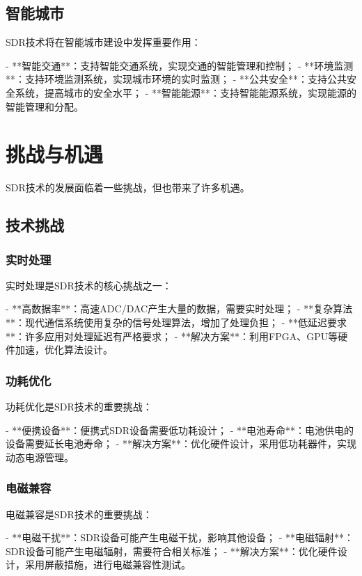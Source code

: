 ﻿\documentclass[UTF8]{ctexbook}
\begin{document}
\subsection{智能城市}

SDR技术将在智能城市建设中发挥重要作用：

- **智能交通**：支持智能交通系统，实现交通的智能管理和控制；
- **环境监测**：支持环境监测系统，实现城市环境的实时监测；
- **公共安全**：支持公共安全系统，提高城市的安全水平；
- **智能能源**：支持智能能源系统，实现能源的智能管理和分配。

\section{挑战与机遇}

SDR技术的发展面临着一些挑战，但也带来了许多机遇。

\subsection{技术挑战}

\subsubsection{实时处理}

实时处理是SDR技术的核心挑战之一：

- **高数据率**：高速ADC/DAC产生大量的数据，需要实时处理；
- **复杂算法**：现代通信系统使用复杂的信号处理算法，增加了处理负担；
- **低延迟要求**：许多应用对处理延迟有严格要求；
- **解决方案**：利用FPGA、GPU等硬件加速，优化算法设计。

\subsubsection{功耗优化}

功耗优化是SDR技术的重要挑战：

- **便携设备**：便携式SDR设备需要低功耗设计；
- **电池寿命**：电池供电的设备需要延长电池寿命；
- **解决方案**：优化硬件设计，采用低功耗器件，实现动态电源管理。

\subsubsection{电磁兼容}

电磁兼容是SDR技术的重要挑战：

- **电磁干扰**：SDR设备可能产生电磁干扰，影响其他设备；
- **电磁辐射**：SDR设备可能产生电磁辐射，需要符合相关标准；
- **解决方案**：优化硬件设计，采用屏蔽措施，进行电磁兼容性测试。
\end{document}

